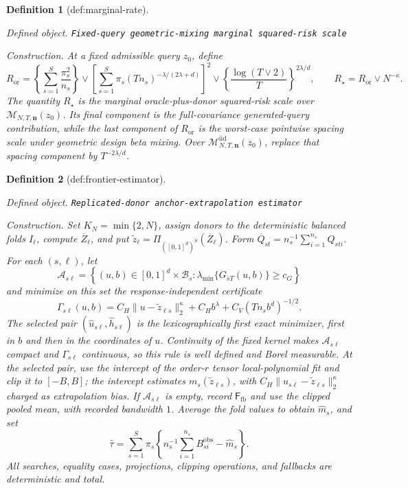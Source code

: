 \documentclass{article}
\newtheorem{definition}{Definition}
\begin{document}
\begin{definition}[def:marginal-rate]\label{def:marginal-rate}
\par\smallskip\noindent\emph{Defined object.} \texttt{Fixed-\allowbreak{}query geometric-\allowbreak{}mixing marginal squared-\allowbreak{}risk scale}
\par\smallskip\noindent\emph{Construction.} At a fixed admissible query \(z_0\), define
\[
 R_{\mathrm{or}}
 =\left\{\sum_{s=1}^{S}\frac{\pi_s^2}{n_s}\right\}
 \vee
 \left[\sum_{s=1}^{S}\pi_s(Tn_s)^{-\lambda/(2\lambda+d)}\right]^2
 \vee
 \left\{\frac{\log(T\vee2)}{T}\right\}^{2\lambda/d},
 \qquad
 R_\star=R_{\mathrm{or}}\vee N^{-\kappa}.
\]
The quantity \(R_\star\) is the marginal oracle-plus-donor squared-risk scale over \(\mathcal M_{N,T,\mathbf n}(z_0)\).  Its final component is the full-covariance generated-query contribution, while the last component of \(R_{\mathrm{or}}\) is the worst-case pointwise spacing scale under geometric design beta mixing.  Over \(\mathcal M^{\mathrm{iid}}_{N,T,\mathbf n}(z_0)\), replace that spacing component by \(T^{-2\lambda/d}\).
\end{definition}

\begin{definition}[def:frontier-estimator]\label{def:frontier-estimator}
\par\smallskip\noindent\emph{Defined object.} \texttt{Replicated-\allowbreak{}donor anchor-\allowbreak{}extrapolation estimator}
\par\smallskip\noindent\emph{Construction.} Set \(K_N=\min\{2,N\}\), assign donors to the deterministic balanced folds \(I_\ell\), compute \(\overline Z_\ell\), and put \(\widetilde z_\ell=\Pi_{([0,1]^d)^S}(\overline Z_\ell)\). Form \(\overline Q_{st}=n_s^{-1}\sum_{i=1}^{n_s}Q_{sti}\). For each \((s,\ell)\), let
\[
\mathcal A_{s\ell}=\left\{(u,b)\in[0,1]^d\times\mathcal B_s:\lambda_{\min}\{G_{sT}(u,b)\}\ge c_G\right\}
\]
and minimize on this set the response-independent certificate
\[
\Gamma_{s\ell}(u,b)=C_H\|u-\widetilde z_{\ell s}\|_2^\kappa+C_Hb^\lambda+C_V(Tn_sb^d)^{-1/2}.
\]
The selected pair \((\widehat u_{s\ell},\widehat h_{s\ell})\) is the lexicographically first exact minimizer, first in \(b\) and then in the coordinates of \(u\). Continuity of the fixed kernel makes \(\mathcal A_{s\ell}\) compact and \(\Gamma_{s\ell}\) continuous, so this rule is well defined and Borel measurable. At the selected pair, use the intercept of the order-\(r\) tensor local-polynomial fit and clip it to \([-B,B]\); the intercept estimates \(m_s(\widetilde z_{\ell s})\), with \(C_H\|\widehat u_{s\ell}-\widetilde z_{\ell s}\|_2^\kappa\) charged as extrapolation bias. If \(\mathcal A_{s\ell}\) is empty, record \(\mathsf F_{\mathrm{fb}}\) and use the clipped pooled mean, with recorded bandwidth \(1\). Average the fold values to obtain \(\widehat m_s\), and set
\[
\widehat\tau=\sum_{s=1}^{S}\pi_s\left\{n_s^{-1}\sum_{i=1}^{n_s}B_{si}^{\mathrm{obs}}-\widehat m_s\right\}.
\]
All searches, equality cases, projections, clipping operations, and fallbacks are deterministic and total.
\end{definition}
\end{document}
